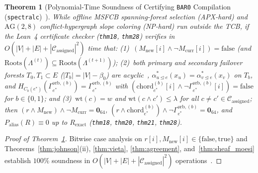 \documentclass[10pt,twocolumn]{article}
\theoremstyle{spectralthm}
\newtheorem{theorem}{Theorem}[section]
\begin{document}
\begin{theorem}[Polynomial-Time Soundness of Certifying \texttt{BAR0} Compilation (\texttt{spectralc})~\cite{mcconnell2011certifying}]
\label{thm:compiler}
While offline MSFCB spanning-forest selection (APX-hard) and $\mathrm{AG}(2,8)$ conflict-hypergraph slope coloring (NP-hard) run outside the TCB, if the Lean~4 certificate checker (\texttt{thm18}, \texttt{thm28}) verifies in $O(|V| + |E| + |\mathcal{C}_{\mathrm{assigned}}|^2)$ time that: (1)~$(M_{\mathrm{new}}[i] \wedge \neg M_{\mathrm{curr}}[i]) = \mathrm{false}$ (and $\mathrm{Roots}(\Lambda^{(t)}) \subseteq \mathrm{Roots}(\Lambda^{(t+1)})$); (2)~both primary and secondary failover forests $T_0, T_1 \subset E$ ($|T_b| = |V| - \beta_0$) are acyclic~\cite{tutte1961problem,nashwilliams1961edge}, $\alpha_{u \trianglelefteq e}^*(x_u) = \alpha_{v \trianglelefteq e}^*(x_v)$ on $T_b$, and $H_{C_b(e^*)}(\Gamma_{e^*}^{\mathrm{orb},(b)}) = \Gamma_{e^*}^{\mathrm{orb},(b)}$ with $(\mathrm{chord}_{e^*}^{(b)}[i] \wedge \neg\Gamma_{e^*}^{\mathrm{orb},(b)}[i]) = \mathrm{false}$ for $b \in \{0,1\}$; and (3)~$\mathrm{wt}(c) = w$ and $\mathrm{wt}(c \wedge c') \le \lambda$ for all $c \neq c' \in \mathcal{C}_{\mathrm{assigned}}$; then $(r \wedge M_{\mathrm{new}}) \wedge \neg M_{\mathrm{curr}} = \mathbf{0}_{64}$, $(r \wedge \mathrm{chord}_{e^*}^{(b)}) \wedge \neg\Gamma_{e^*}^{\mathrm{orb},(b)} = \mathbf{0}_{64}$, and $P_{\mathrm{alias}}(R) \equiv 0$ up to $R_{\mathrm{exact}}$ (\texttt{thm18}, \texttt{thm20}, \texttt{thm21}, \texttt{thm28}).
\end{theorem}
\begin{proof}[Proof of Theorem~\ref{thm:compiler}]
Bitwise case analysis on $r[i], M_{\mathrm{new}}[i] \in \{\mathrm{false}, \mathrm{true}\}$ and Theorems~\ref{thm:johnson}(ii), \ref{thm:vieta}, \ref{thm:agreement}, and~\ref{thm:sheaf_moesi} establish $100\%$ soundness in $O(|V| + |E| + |\mathcal{C}_{\mathrm{assigned}}|^2)$ operations~\cite{mcconnell2011certifying}.
\end{proof}
\end{document}
